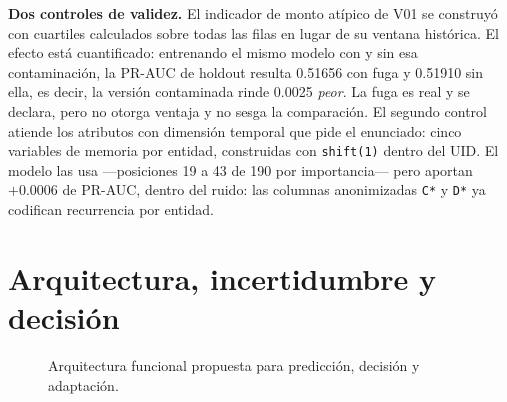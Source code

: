 \documentclass[11pt,letterpaper]{article}
\begin{document}
\textbf{Dos controles de validez.} El indicador de monto atípico de V01 se construyó con cuartiles calculados sobre todas las filas en lugar de su ventana histórica. El efecto está cuantificado: entrenando el mismo modelo con y sin esa contaminación, la PR-AUC de holdout resulta 0.51656 con fuga y 0.51910 sin ella, es decir, la versión contaminada rinde 0.0025 \emph{peor}. La fuga es real y se declara, pero no otorga ventaja y no sesga la comparación. El segundo control atiende los atributos con dimensión temporal que pide el enunciado: cinco variables de memoria por entidad, construidas con \texttt{shift(1)} dentro del UID. El modelo las usa —posiciones 19 a 43 de 190 por importancia— pero aportan $+0.0006$ de PR-AUC, dentro del ruido: las columnas anonimizadas \texttt{C*} y \texttt{D*} ya codifican recurrencia por entidad.

\section{Arquitectura, incertidumbre y decisión}

\begin{figure}[H]\centering
{}
\caption{Arquitectura funcional propuesta para predicción, decisión y adaptación.}
\end{figure}
\end{document}
